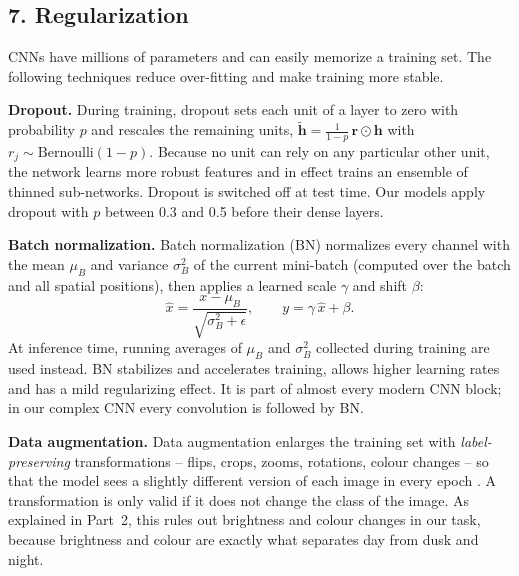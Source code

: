 \documentclass[12pt,letterpaper]{article}
\begin{document}
\subsection{7. Regularization}
CNNs have millions of parameters and can easily memorize a training set. The following techniques reduce
over-fitting and make training more stable.

\textbf{Dropout.} During training, dropout \cite{srivastava2014} sets each unit of a layer to zero with probability
$p$ and rescales the remaining units, $\tilde{\symbf h}=\frac{1}{1-p}\,\symbf r\odot\symbf h$ with
$r_j\sim\mathrm{Bernoulli}(1-p)$. Because no unit can rely on any particular other unit, the network learns more
robust features and in effect trains an ensemble of thinned sub-networks. Dropout is switched off at test time. Our
models apply dropout with $p$ between 0.3 and 0.5 before their dense layers.

\textbf{Batch normalization.} Batch normalization (BN) \cite{ioffe2015} normalizes every channel with the mean
$\mu_B$ and variance $\sigma_B^2$ of the current mini-batch (computed over the batch and all spatial positions), then
applies a learned scale $\gamma$ and shift $\beta$:
\begin{equation}
  \hat x=\frac{x-\mu_B}{\sqrt{\sigma_B^2+\epsilon}},\qquad y=\gamma\,\hat x+\beta .
  \label{eq:bn}
\end{equation}
At inference time, running averages of $\mu_B$ and $\sigma_B^2$ collected during training are used instead. BN
stabilizes and accelerates training, allows higher learning rates and has a mild regularizing effect. It is part of
almost every modern CNN block; in our complex CNN every convolution is followed by BN.

\textbf{Data augmentation.} Data augmentation enlarges the training set with \emph{label-preserving}
transformations -- flips, crops, zooms, rotations, colour changes -- so that the model sees a slightly different
version of each image in every epoch \cite{shorten2019}. A transformation is only valid if it does not change the
class of the image. As explained in Part~2, this rules out brightness and colour changes in our task, because
brightness and colour are exactly what separates day from dusk and night.
\end{document}
